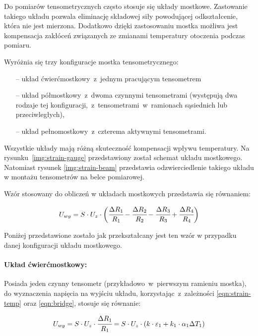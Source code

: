 Do pomiarów tensometrycznych często stosuje się układy mostkowe. Zastowanie takiego układu pozwala
eliminację składowej siły powodującej odkształcenie, która nie jest mierzona. Dodatkowo dzięki
zastosowaniu mostka możliwa jest kompensacja zakłóceń związanych ze zmianami temperatury otoczenia
podczas pomiaru.

Wyróżnia się trzy konfiguracje mostka tensometrycznego:
\begin{itemize}
  \item [--] układ ćwierćmostkowy~z~jednym pracującym tensometrem
  \item [--] układ półmostkowy~z~dwoma czynnymi tensometrami (występują dwa rodzaje tej
        konfiguracji,~z~tensometrami~w~ramionach sąsiednich lub przeciwległych),
  \item [--] układ pełnomostkowy~z~czterema aktywnymi tensometrami.
\end{itemize}
Wszystkie układy mają różną skuteczność kompensacji wpływu temperatury. Na
rysunku~\ref{img:strain-gauge} przedstawiony został schemat układu mostkowego. Natomiast rysunek
\ref{img:strain-beam} przedstawia odzwierciedlenie takiego układu w montażu tensometrów na belce
pomiarowej.



Wzór stosowany do obliczeń w układach mostkowych przedstawia się równaniem:

\begin{equation}\label{eqn:bridge}
  U_{wy} =S\cdot{U_z}\cdot\bigg(\cfrac{\Delta R_1}{R_1}-\cfrac{\Delta R_2}{R_2}-
  \cfrac{\Delta R_3}{R_3}+\cfrac{\Delta R_4}{R_4}\bigg)
\end{equation}

Poniżej przedstawione zostało jak przekształcany jest ten wzór w przypadku danej konfiguracji układu
mostkowego.

\paragraph{Układ ćwierćmostkowy:} Posiada jeden czynny tensometr (przykładowo~w~pierwszym ramieniu
mostka), do wyznaczenia napięcia na wyjściu układu, korzystając~z~zależności \ref{eqn:strain-temp}
oraz \ref{eqn:bridge}, stosuje się równanie:

\begin{equation}\label{eqn:quater-bridge}
  U_{wy}=S\cdot{U_z}\cdot\cfrac{\Delta R_1}{R_1}=S\cdot{U_z}\cdot({k}
  \cdot\varepsilon_1+{k_1}\cdot\alpha_1\Delta{T_1})
\end{equation}

